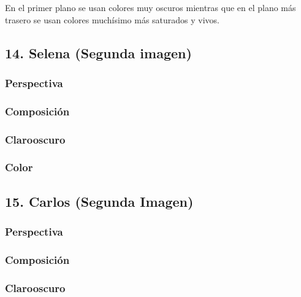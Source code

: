 \documentclass[12pt]{article}
\begin{document}
        En el primer plano se usan colores muy oscuros mientras que en el plano más trasero se usan colores muchísimo más saturados y vivos. 

\newpage


    \subsection{14. Selena (Segunda imagen)}
        \subsubsection{Perspectiva}

        \subsubsection{Composición}

        \subsubsection{Clarooscuro}

        \subsubsection{Color}
        \newpage


    \subsection{15. Carlos (Segunda Imagen)}
        \subsubsection{Perspectiva}

        \subsubsection{Composición}

        \subsubsection{Clarooscuro}
\end{document}
